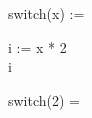 

    \begin{preproc}

        switch(x) := \begin{block}
             i := x * 2 \\
             i
        \end{block}

        switch(2) =  \\

    \end{preproc}


